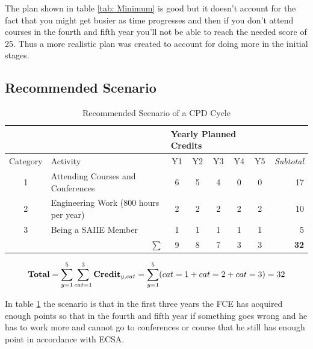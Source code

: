 \documentclass[11pt,a4paper]{article}
\begin{document}
		The plan shown in table \ref{tab: Minimum} is good but it doesn't account for the fact that you might get busier as time progresses and then if you don't attend courses in the fourth and fifth year you'll not be able to reach the needed score of 25. Thus a more realistic plan was created to account for doing more in the initial stages.
	
	
	\subsection{Recommended Scenario}
	
	\begin{table}[H]
\centering
\caption{Recommended Scenario of a CPD Cycle}
\label{tab: Recommended}
\begin{tabular}{cl|c|c|c|c|c|r}
\cline{3-7}
\multicolumn{1}{l}{}           &                                       & \multicolumn{5}{l|}{Yearly Planned Credits} & \multicolumn{1}{l}{}                   \\ \hline
\multicolumn{1}{|l|}{Category} & Activity                              & Y1      & Y2     & Y3     & Y4     & Y5     & \multicolumn{1}{r|}{\textit{Subtotal}} \\ \hline
\multicolumn{1}{|c|}{1}        & Attending Courses and Conferences     & 6       & 5      & 4      & 0      & 0      & \multicolumn{1}{r|}{17}                \\ \hline
\multicolumn{1}{|c|}{2}        & Engineering Work (800 hours per year) & 2       & 2      & 2      & 2      & 2      & \multicolumn{1}{r|}{10}                \\ \hline
\multicolumn{1}{|c|}{3}        & Being a SAIIE Member                  & 1       & 1      & 1      & 1      & 1      & \multicolumn{1}{r|}{5}                 \\ \hline
\multicolumn{2}{|r|}{$\sum$}                                           & 9       & 8      & 7      & 3      & 3      & \multicolumn{1}{r|}{\textbf{32}}       \\ \hline
\end{tabular}
\end{table}

	\begin{equation}\label{eq:3}
		\begin{array}{c}
			\text{\textbf{Total}} = \displaystyle\sum\limits_{y=1}^{5} \displaystyle\sum\limits_{cat=1}^{3} \textbf{Credit}_{y, cat} = \displaystyle\sum\limits_{y=1}^{5} (cat=1 + cat=2 + cat=3) = 32
		\end{array}
	\end{equation}

	In table \ref{tab: Recommended} the scenario is that in the first three years the FCE has acquired enough points so that in the fourth and fifth year if something goes wrong and he has to work more and cannot go to conferences or course that he still has enough point in accordance with ECSA.
	
	\pagebreak
		
	
					
\end{document}
